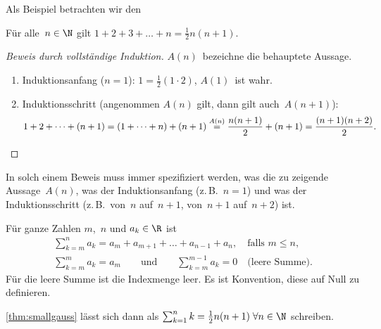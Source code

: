 \documentclass[a4paper]{article}
\begin{document}
Als Beispiel betrachten wir den

\begin{theorem}\label{thm:smallgauss}
    Für alle~$n \in \N$ gilt $1 + 2 + 3 + \dots + n = \frac{1}{2} n (n + 1)$.
\end{theorem}

\begin{proof}[Beweis durch vollständige Induktion]
    $A(n)$~bezeichne die behauptete Aussage.

    \begin{enumerate}
        \item Induktionsanfang ($n = 1$): $1 = \frac{1}{2} (1 \cdot 2)$, $A(1)$~ist wahr.
        \item Induktionsschritt (angenommen $A(n)$ gilt, dann gilt auch~$A(n + 1)$):
              \begin{equation*}
                  1 + 2 + \dots + (n + 1) = (1 + \dots + n) + (n + 1) \overset{A(n)}{=} \frac{n (n + 1)}{2} + (n + 1) = \frac{(n + 1) (n + 2)}{2}. \qedhere
              \end{equation*}
    \end{enumerate}
\end{proof}

\begin{remark}
    In solch einem Beweis muss immer spezifiziert werden, was die zu zeigende Aussage~$A(n)$, was der Induktionsanfang (z.\,B.~$n = 1$) und was der Induktionsschritt (z.\,B.\ von~$n$ auf~$n + 1$, von~$n + 1$ auf~$n + 2$) ist.
\end{remark}

\begin{notation}[Summenzeichen]
    Für ganze Zahlen $m$,~$n$ und $a_k \in \R$ ist
    \begin{gather*}
        \sum_{k=m}^n a_k = a_m + a_{m+1} + \dots + a_{n-1} + a_n, \quad\text{falls } m \leq n, \\
        \sum_{k=m}^m a_k = a_m \qquad\text{und}\qquad \sum_{k=m}^{m-1} a_k = 0 \quad\text{(leere Summe)}.
    \end{gather*}
    Für die leere Summe ist die Indexmenge leer. Es ist Konvention, diese auf Null zu definieren.
\end{notation}

\begin{example}
    \cref{thm:smallgauss} lässt sich dann als $\sum_{k=1}^n k = \frac{1}{2}n(n+1) \;\forall n \in \N$ schreiben.
\end{example}
\end{document}
